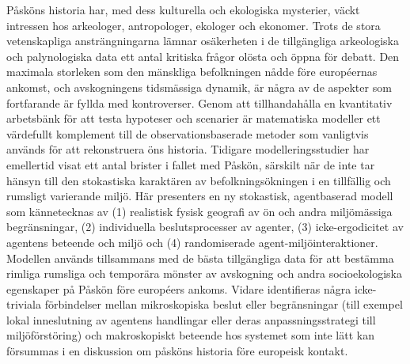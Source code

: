 
Påsköns historia har, med dess kulturella och ekologiska mysterier, väckt intressen hos arkeologer, antropologer, ekologer och ekonomer. 
Trots de stora vetenskapliga ansträngningarna lämnar osäkerheten i de tillgängliga arkeologiska och palynologiska data ett antal kritiska frågor olösta och öppna för debatt. 
Den maximala storleken som den mänskliga befolkningen nådde före européernas ankomst, och avskogningens tidsmässiga dynamik, är några av de aspekter som fortfarande är fyllda med kontroverser. 
Genom att tillhandahålla en kvantitativ arbetsbänk för att testa hypoteser och scenarier är matematiska modeller ett värdefullt komplement till de observationsbaserade metoder som vanligtvis används för att rekonstruera öns historia. 
Tidigare modelleringsstudier har emellertid visat ett antal brister i fallet med Påskön, särskilt när de inte tar hänsyn till den stokastiska karaktären av befolkningsökningen i en tillfällig och rumsligt varierande miljö. 
Här presenters en ny stokastisk, agentbaserad modell som kännetecknas av (1) realistisk fysisk geografi av ön och andra miljömässiga begränsningar, (2) individuella beslutsprocesser av agenter, (3) icke-ergodicitet av agentens beteende och miljö och (4) randomiserade agent-miljöinteraktioner. 
Modellen används tillsammans med de bästa tillgängliga data för att bestämma rimliga rumsliga och temporära mönster av avskogning och andra socioekologiska egenskaper på Påskön före européers ankoms. Vidare identifieras några icke-triviala förbindelser mellan mikroskopiska beslut eller begränsningar (till exempel lokal inneslutning av agentens handlingar eller deras anpassningsstrategi till miljöförstöring) och makroskopiskt beteende hos systemet som inte lätt kan försummas i en diskussion om påsköns historia före europeisk kontakt.